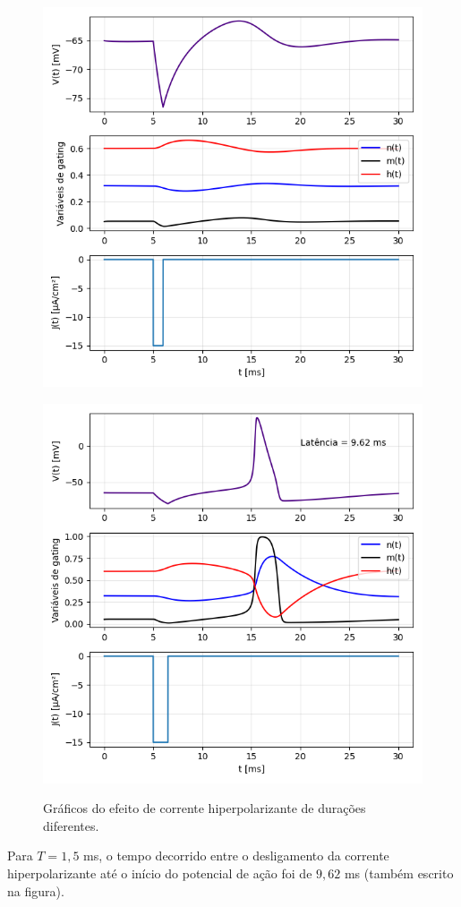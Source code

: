 \documentclass[english,11pt,a4paper]{article}
\begin{document}
		\begin{figure}[H]
		\centering
		\begin{minipage}{0.49\textwidth}
			\centering
			\includegraphics[width=\linewidth]{../figures/ex_7_1.png}
			\captionsetup{justification=centering, labelformat=empty}
			\label{}
		\end{minipage}
		\hfill
		\begin{minipage}{0.49\textwidth}
			\centering
			\includegraphics[width=\linewidth]{../figures/ex_7_2.png}
			\captionsetup{justification=centering, labelformat=empty}
			\label{}
		\end{minipage}
		\caption{Gráficos do efeito de corrente hiperpolarizante de durações diferentes.}
		\label{fig8}
	\end{figure}
	
	Para $T = 1,5$ ms, o tempo decorrido entre o desligamento da corrente hiperpolarizante até o início do potencial de ação foi de $9,62$ ms (também escrito na figura).
	
	
	
	
	
	
\end{document}
